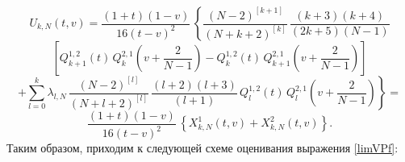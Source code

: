 \documentclass[12pt]{book}
\begin{document}
\begin{equation*}
U_{k,N}(t,v)=
\frac{(1+t)(1-v)}{16 (t-v)^2}\,
\left\{
   \frac{(N-2)^{[k+1]}}{(N+k+2)^{[k]}}  \,
   \frac{(k+3)(k+4)}{(2k+5)(N-1)}
\right.
\end{equation*}
\begin{equation*}
   \left[
        Q^{1,2}_{k+1}(t) \,Q^{2,1}_{k}\left(v +\frac{2}{N-1} \right) -  Q^{1,2}_{k}(t) \, Q^{2,1}_{k+1} \left(v +\frac{2}{N-1} \right)
   \right]
\end{equation*}
\begin{equation*}
\left.
   +
   \sum_{l=0}^{k} \lambda_{l,N}\,
    \frac{(N-2)^{[l]}}{(N+l+2)^{[l]}} \, \frac{(l+2)(l+3)}{(l+1)}\,
    Q^{1,2}_{l}(t) \,Q^{2,1}_{l}\left(v +\frac{2}{N-1} \right)
\right\}=
\end{equation*}
\begin{equation*}
\frac{(1+t)(1-v)}{16 (t-v)^2}\,\left\{
    X^{1}_{k,N}(t,v) + X^{2}_{k,N}(t,v)
\right\}.
\end{equation*}
Таким образом, приходим к следующей схеме оценивания выражения \eqref{limVPf}:
\end{document}

